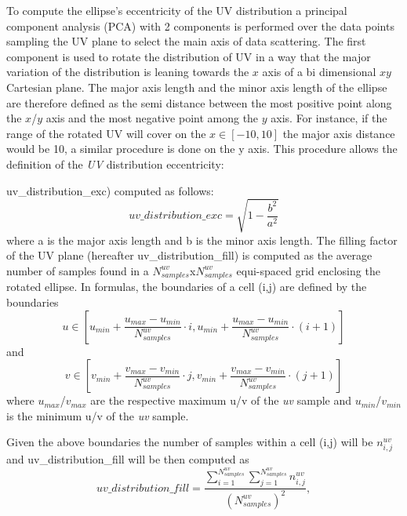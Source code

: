 \documentclass[11pt,a4paper]{ivoa}
\begin{document}
To compute the ellipse's eccentricity of the UV distribution a principal component analysis 
(PCA) with 2 components is performed over the data points sampling the UV plane to select the 
main axis of data scattering. 
The first component is used to rotate the distribution of UV in a way that the major variation 
of the distribution is leaning towards the $x$ axis of a bi dimensional $xy$ Cartesian plane. 
The major axis length and the minor axis length of the ellipse are therefore defined as the 
semi distance between the most positive point along the $x$/$y$ axis and the most negative point 
among the $y$ axis. For instance, if the range of the rotated UV will cover on the $x \in [-10, 
10]$ the major axis distance would be 10, a similar procedure is done on the y axis. This 
procedure allows the definition of the \emph{UV} distribution eccentricity:

uv\_distribution\_exc) computed as follows:
\begin{equation}
uv\_distribution\_exc = \sqrt{1-\frac{b^2}{a^2}}
\end{equation}
where a is the major axis length and b is the minor axis length.
The filling factor of the UV plane (hereafter uv\_distribution\_fill) is computed as the average 
number of samples found in a $N^{uv}_{samples}$x$N^{uv}_{samples}$ equi-spaced grid enclosing the 
rotated ellipse. In formulas, the boundaries of a cell (i,j) are defined by the boundaries
\begin{equation}
u \in [u_{min} + \frac{u_{max} - u_{min}}{N^{uv}_{samples}} \cdot i , u_{min} + \frac{u_{max} - 
u_{min}}{N^{uv}_{samples}} \cdot (i + 1)]
\end{equation} 
and
\begin{equation}
v \in [v_{min} + \frac{v_{max} - v_{min}}{N^{uv}_{samples}} \cdot j , v_{min} + \frac{v_{max} - 
v_{min}}{N^{uv}_{samples}} \cdot (j + 1)]
\end{equation} 
where $u_{max}$/$v_{max}$ are the respective maximum u/v of the \emph{uv} sample and 
$u_{min}$/$v_{min}$ is the minimum u/v of the \emph{uv} sample.

Given the above boundaries the number of samples within a cell (i,j) will be $n^{uv}_{i,j}$ 
and uv\_distribution\_fill will be then computed as 
\begin{equation}
uv\_distribution\_fill = \frac{\sum^{N^{uv}_{samples}}_{i=1} \sum^{N^{uv}_{samples}}_{j=1} 
n^{uv}_{i,j} }{(N^{uv}_{samples}) ^ 2},
\end{equation}
\end{document}
